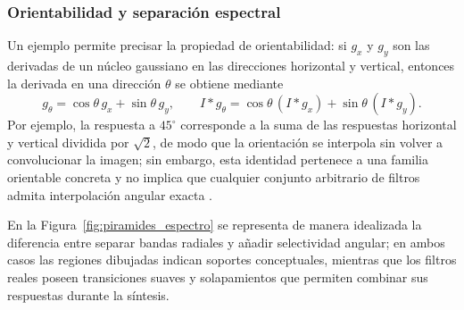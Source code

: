 \subsubsection{Orientabilidad y separación espectral}

Un ejemplo permite precisar la propiedad de orientabilidad: si $g_x$ y $g_y$ son las derivadas de un núcleo gaussiano en las direcciones horizontal y vertical, entonces la derivada en una dirección $\theta$ se obtiene mediante
\begin{equation}
 g_\theta=\cos\theta\,g_x+\sin\theta\,g_y,
 \qquad I*g_\theta=\cos\theta\,(I*g_x)+\sin\theta\,(I*g_y).
 \label{eq:piramides_derivada_orientable}
\end{equation}
Por ejemplo, la respuesta a $45^\circ$ corresponde a la suma de las respuestas horizontal y vertical dividida por $\sqrt{2}$, de modo que la orientación se interpola sin volver a convolucionar la imagen; sin embargo, esta identidad pertenece a una familia orientable concreta y no implica que cualquier conjunto arbitrario de filtros admita interpolación angular exacta \cite{freeman1991steerable}.

En la Figura~\ref{fig:piramides_espectro} se representa de manera idealizada la diferencia entre separar bandas radiales y añadir selectividad angular; en ambos casos las regiones dibujadas indican soportes conceptuales, mientras que los filtros reales poseen transiciones suaves y solapamientos que permiten combinar sus respuestas durante la síntesis.

